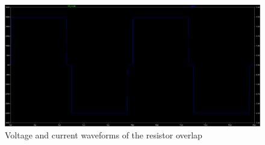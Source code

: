 \begin{figure}[H]
	\centering
	\includegraphics[width=\textwidth]{pictures/implementation/ind/ind_load.PNG}
	\caption{Voltage and current waveforms of the resistor overlap}
	\label{fig:ind_load}
\end{figure}